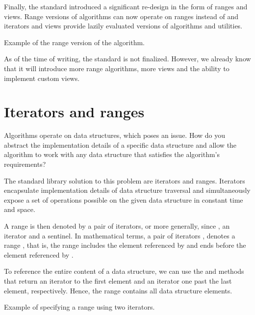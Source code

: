 Finally, the  standard introduced a significant re-design in the form of ranges and views. Range versions of algorithms can now operate on ranges instead of  and  iterators and views provide lazily evaluated versions of algorithms and utilities.

\begin{box-note}
\footnotesize Example of the range version of the  algorithm.
\tcblower
{}
\end{box-note}

As of the time of writing, the  standard is not finalized. However, we already know that it will introduce more range algorithms, more views and the ability to implement custom views.

\section{Iterators and ranges}

Algorithms operate on data structures, which poses an issue. How do you abstract the implementation details of a specific data structure and allow the algorithm to work with any data structure that satisfies the algorithm's requirements?

The \CC standard library solution to this problem are iterators and ranges. Iterators encapsulate implementation details of data structure traversal and simultaneously expose a set of operations possible on the given data structure in constant time and space.

A range is then denoted by a pair of iterators, or more generally, since , an iterator and a sentinel. In mathematical terms, a pair of iterators ,  denotes a range \cpp{[it1, it2)}, that is, the range includes the element referenced by  and ends before the element referenced by .

To reference the entire content of a data structure, we can use the  and  methods that return an iterator to the first element and an iterator one past the last element, respectively. Hence, the range \cpp{[begin, end)} contains all data structure elements.

\begin{box-note}
\footnotesize Example of specifying a range using two iterators.
\tcblower
{}
\end{box-note}

